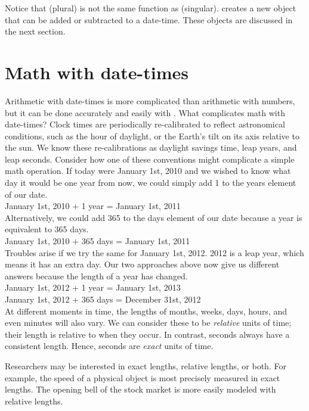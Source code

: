 \documentclass[article]{jss}
\begin{document}
Notice that  (plural) is not the same function as  (singular).  creates a new object that can be added or subtracted to a  date-time. These objects are discussed in the next section. 

\section{Math with date-times}
\label{sec:types}
Arithmetic with date-times is more complicated than arithmetic with numbers, but it can be done accurately and easily with . What complicates math with date-times? Clock times are periodically re-calibrated to reflect astronomical conditions, such as the hour of daylight, or the Earth's tilt on its axis relative to the sun. We know these re-calibrations as daylight savings time, leap years, and leap seconds. Consider how one of these conventions might complicate a simple math operation. If today were January 1st, 2010 and we wished to know what day it would be one year from now, we could simply add 1 to the years element of our date.\\

January 1st, 2010 + 1 year = January 1st, 2011\\

Alternatively, we could add 365 to the days element of our date because a year is equivalent to 365 days. \\

January 1st, 2010 + 365 days = January 1st, 2011\\

Troubles arise if we try the same for January 1st, 2012. 2012 is a leap year, which means it has an extra day. Our two approaches above now give us different answers because the length of a year has changed.\\ 

January 1st, 2012 + 1 year = January 1st, 2013\\
January 1st, 2012 + 365 days = December 31st,  2012\\

At different moments in time, the lengths of months, weeks, days, hours, and even minutes will also vary. We can consider these to be \emph{relative} units of time; their length is relative to when they occur. In contrast, seconds always have a consistent length. Hence, seconds are \emph{exact} units of time.

Researchers may be interested in exact lengths, relative lengths, or both. For example, the speed of a physical object is most precisely measured in exact lengths. The opening bell of the stock market is more easily modeled with relative lengths.
\end{document}
